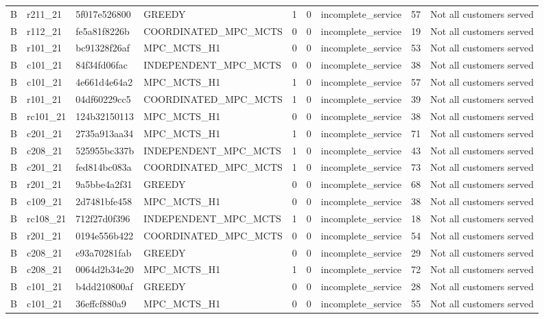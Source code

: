 \begin{table}
{\begin{tabular}{llllrrlrl}
B & r211\_21 & 5f017e526800 & GREEDY & 1 & 0 & incomplete\_service & 57 & Not all customers served \\
B & r112\_21 & fe5a81f8226b & COORDINATED\_MPC\_MCTS & 0 & 0 & incomplete\_service & 19 & Not all customers served \\
B & r101\_21 & bc91328f26af & MPC\_MCTS\_H1 & 0 & 0 & incomplete\_service & 53 & Not all customers served \\
B & c101\_21 & 84f34fd06fac & INDEPENDENT\_MPC\_MCTS & 0 & 0 & incomplete\_service & 38 & Not all customers served \\
B & c101\_21 & 4e661d4e64a2 & MPC\_MCTS\_H1 & 1 & 0 & incomplete\_service & 57 & Not all customers served \\
B & r101\_21 & 04df60229cc5 & COORDINATED\_MPC\_MCTS & 1 & 0 & incomplete\_service & 39 & Not all customers served \\
B & rc101\_21 & 124b32150113 & MPC\_MCTS\_H1 & 0 & 0 & incomplete\_service & 38 & Not all customers served \\
B & c201\_21 & 2735a913aa34 & MPC\_MCTS\_H1 & 1 & 0 & incomplete\_service & 71 & Not all customers served \\
B & c208\_21 & 525955bc337b & INDEPENDENT\_MPC\_MCTS & 1 & 0 & incomplete\_service & 43 & Not all customers served \\
B & c201\_21 & fed814bc083a & COORDINATED\_MPC\_MCTS & 1 & 0 & incomplete\_service & 73 & Not all customers served \\
B & r201\_21 & 9a5bbe4a2f31 & GREEDY & 0 & 0 & incomplete\_service & 68 & Not all customers served \\
B & c109\_21 & 2d7481bfe458 & MPC\_MCTS\_H1 & 0 & 0 & incomplete\_service & 38 & Not all customers served \\
B & rc108\_21 & 712f27d0f396 & INDEPENDENT\_MPC\_MCTS & 1 & 0 & incomplete\_service & 18 & Not all customers served \\
B & r201\_21 & 0194e556b422 & COORDINATED\_MPC\_MCTS & 0 & 0 & incomplete\_service & 54 & Not all customers served \\
B & c208\_21 & e93a70281fab & GREEDY & 0 & 0 & incomplete\_service & 29 & Not all customers served \\
B & c208\_21 & 0064d2b34e20 & MPC\_MCTS\_H1 & 1 & 0 & incomplete\_service & 72 & Not all customers served \\
B & c101\_21 & b4dd210800af & GREEDY & 0 & 0 & incomplete\_service & 28 & Not all customers served \\
B & c101\_21 & 36effcf880a9 & MPC\_MCTS\_H1 & 0 & 0 & incomplete\_service & 55 & Not all customers served \\

\end{tabular}}
\end{table}
